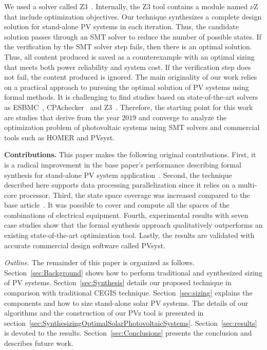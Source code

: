 \documentclass[review]{elsarticle}
\begin{document}
We used a solver called Z3~\citep{BjornerPF15}. Internally, the Z3 tool contains a module named $\nu$Z that include optimization objectives. Our technique synthesizes a complete design solution for stand-alone PV systems in each iteration. Thus, the candidate solution passes through an SMT solver to reduce the number of possible states. If the verification by the SMT solver step fails, then there is an optimal solution. Thus, all content produced is saved as a counterexample with an optimal sizing that meets both power reliability and system cost. If the verification step does not fail, the content produced is ignored. The main originality of our work relies on a practical approach to pursuing the optimal solution of PV systems using formal methods. It is challenging to find studies based on state-of-the-art solvers as ESBMC~\citep{esbmc2018}, CPAchecker~\citep{Beyer2011} and Z3~\citep{BjornerPF15}. Therefore, the starting point for this work~\citep{VSTTE2020, TrindadeCordeiro19, AraujoBCF16} are studies that derive from the year $2019$ and converge to analyze the optimization problem of photovoltaic systems using SMT solvers and commercial tools such as HOMER and PVsyst. 

\noindent \textbf{Contributions.} This paper makes the following original contributions. First, it is a radical improvement in the base paper's performance describing formal synthesis for stand-alone PV system application~\citep{DBLP:journals/corr/abs-1909-13139}. Second, the technique described here supports data processing parallelization since it relies on a multi-core processor. Third, the state space coverage was increased compared to the base article~\citep{VSTTE2020}. It was possible to cover and compute all the spaces of the combinations of electrical equipment. Fourth, experimental results with seven case studies show that the formal synthesis approach qualitatively outperforms an existing state-of-the-art optimization tool. Lastly, the results are validated with accurate commercial design software called PVsyst.

\noindent \textit{Outline}. The remainder of this paper is organized as follows. Section~\ref{sec:Background} shows how to perform traditional and synthesized sizing of PV systems. Section~\ref{sec:Synthesis} details our proposed technique in comparison with traditional CEGIS technique. Section~\ref{sec:sizing} explains the components and how to size stand-alone solar PV systems. The details of our algorithms and the construction of our PVz tool is presented in section~\ref{sec:SynthesizingOptimalSolarPhotovoltaicSystems}. Section~\ref{sec:results} is devoted to the results. Section~\ref{sec:Conclusions} presents the conclusion and describes future work.
\end{document}

